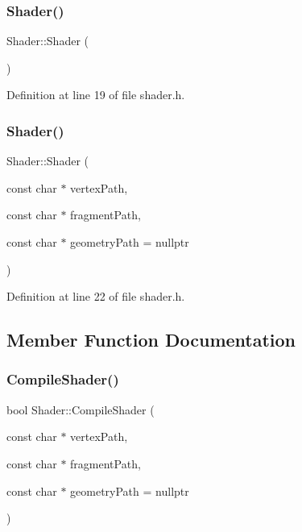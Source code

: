 \subsubsection{\texorpdfstring{Shader()}{Shader()}\hspace{0.1cm}{\footnotesize\ttfamily [1/2]}}
{\footnotesize\ttfamily Shader\+::\+Shader (\begin{DoxyParamCaption}{ }\end{DoxyParamCaption})\hspace{0.3cm}{\ttfamily [inline]}}



Definition at line 19 of file shader.\+h.

\mbox{\label{class_shader_aa732beb72038e86aca70a34c369a255e}} 
\subsubsection{\texorpdfstring{Shader()}{Shader()}\hspace{0.1cm}{\footnotesize\ttfamily [2/2]}}
{\footnotesize\ttfamily Shader\+::\+Shader (\begin{DoxyParamCaption}\item[{const char $\ast$}]{vertex\+Path,  }\item[{const char $\ast$}]{fragment\+Path,  }\item[{const char $\ast$}]{geometry\+Path = {\ttfamily nullptr} }\end{DoxyParamCaption})\hspace{0.3cm}{\ttfamily [inline]}}



Definition at line 22 of file shader.\+h.



\subsection{Member Function Documentation}
\mbox{\label{class_shader_a9a0b2bef331054185418a7a56da32697}} 
\subsubsection{\texorpdfstring{CompileShader()}{CompileShader()}}
{\footnotesize\ttfamily bool Shader\+::\+Compile\+Shader (\begin{DoxyParamCaption}\item[{const char $\ast$}]{vertex\+Path,  }\item[{const char $\ast$}]{fragment\+Path,  }\item[{const char $\ast$}]{geometry\+Path = {\ttfamily nullptr} }\end{DoxyParamCaption})\hspace{0.3cm}{\ttfamily [inline]}}


